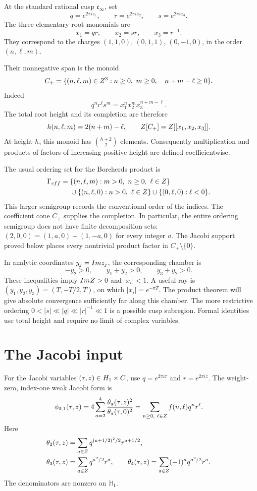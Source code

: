 At the standard rational cusp \(\mathfrak c_\infty\), set
\[
 q=e^{2\pi iz_1},\qquad r=e^{2\pi iz_2},\qquad
 s=e^{2\pi iz_3}.
\]
The three elementary root monomials are
\[
 x_1=qr,\qquad x_2=sr,\qquad x_3=r^{-1}.
\]
They correspond to the charges
\((1,1,0)\), \((0,1,1)\), \((0,-1,0)\), in the order
\((n,\ell,m)\).

Their nonnegative span is the monoid
\[
 C_+=\{(n,\ell,m)\in Z^3:n\geq0,\ m\geq0,\quad
                                  n+m-\ell\geq0\}.
\]
Indeed
\[
 q^nr^\ell s^m=x_1^n x_2^m x_3^{n+m-\ell}.
\]
The total root height and its completion are therefore
\[
 h(n,\ell,m)=2(n+m)-\ell,\qquad
 Z[C_+]=Z[[x_1,x_2,x_3]].
\]
At height \(h\), this monoid has \(\binom{h+2}{2}\) elements.
Consequently multiplication and products of factors of increasing
positive height are defined coefficientwise.

The usual ordering set for the Borcherds product is
\[
\begin{split}
 \Gamma_{eff}={}&
 \{(n,\ell,m):m>0,\ n\geq0,\ \ell\in Z\}\\
 &{}\cup\{(n,\ell,0):n>0,\ \ell\in Z\}
 \cup\{(0,\ell,0):\ell<0\}.
\end{split}
\]
This larger semigroup records the conventional order of the indices.
The coefficient cone \(C_+\) supplies the completion.  In particular,
the entire ordering semigroup does not have finite decomposition
sets: \((2,0,0)=(1,a,0)+(1,-a,0)\) for every integer \(a\).
The Jacobi support proved below places every nontrivial product factor
in \(C_+\setminus\{0\}\).

In analytic coordinates \(y_j=Im z_j\), the corresponding chamber is
\[
 -y_2>0,\qquad y_1+y_2>0,\qquad y_3+y_2>0.
\]
These inequalities imply \(Im Z>0\) and \(|x_i|<1\).
A useful ray is \((y_1,y_2,y_3)=(T,-T/2,T)\), on which
\(|x_i|=e^{-\pi T}\).  The product theorem will give absolute
convergence sufficiently far along this chamber.  The more restrictive
ordering \(0<|s|\ll|q|\ll|r|^{-1}\ll1\) is a possible cusp
subregion.  Formal identities use total height and require no limit
of complex variables.

\section{The Jacobi input}
\label{sec:view1-jacobi-input}

For the Jacobi variables \((\tau,z)\in H_1\times C\), use
\(q=e^{2\pi i\tau}\) and \(r=e^{2\pi iz}\).
The weight-zero, index-one weak Jacobi form is
\[
 \phi_{0,1}(\tau,z)
 =4\sum_{a=2}^4\frac{\theta_a(\tau,z)^2}{\theta_a(\tau,0)^2}
 =\sum_{n\geq0,\ \ell\in Z}f(n,\ell)q^nr^\ell.
\]
Here
\[
\begin{aligned}
 \theta_2(\tau,z)&=\sum_{a\in Z}q^{(a+1/2)^2/2}r^{a+1/2},\\
 \theta_3(\tau,z)&=\sum_{a\in Z}q^{a^2/2}r^a,\qquad
 \theta_4(\tau,z)=\sum_{a\in Z}(-1)^a q^{a^2/2}r^a.
\end{aligned}
\]
The denominators are nonzero on \(\mathbb H_1\).

